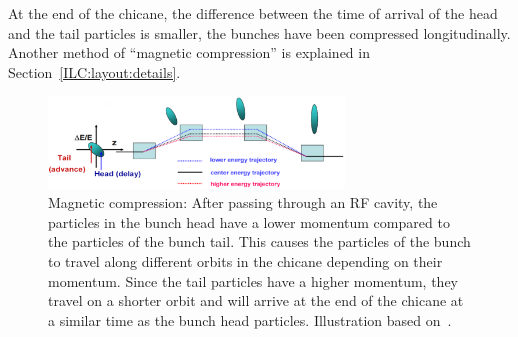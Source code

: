 At the end of the chicane, the difference between the time of arrival of the head and the tail particles is smaller, the bunches have been compressed longitudinally.
Another method of ``magnetic compression'' is explained in Section~\ref{ILC:layout:details}.
\begin{figure}[h]
\centering
\includegraphics[width=0.7\textwidth]{Figures/Magnetic_Compression.png}
\caption[Magnetic compression]{Magnetic compression: After passing through an RF cavity, the particles in the bunch head have a lower momentum compared to the particles of the bunch tail.
This causes the particles of the bunch to travel along different orbits in the chicane depending on their momentum.
Since the tail particles have a higher momentum, they travel on a shorter orbit and will arrive at the end of the chicane at a similar time as the bunch head particles.
Illustration based on~\cite[p. 75]{Bunching}.}
\label{fig:Magnetic_compression}
\end{figure}

